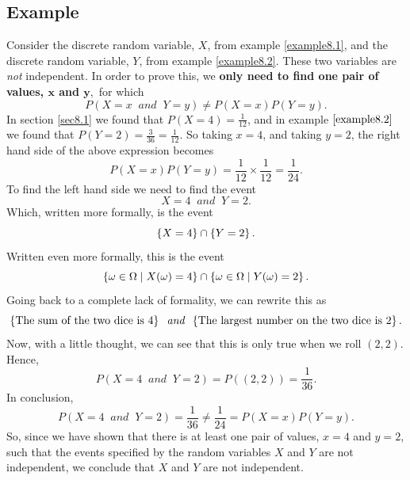 \subsection{Example}
Consider the discrete random variable, $X$, from example \ref{example8.1}, and the discrete random variable, $Y$, from example \ref{example8.2}. These two variables are \textit{not} independent. In order to prove this, we \textbf{only need to find one pair of values, $\boldsymbol{x}$ and $\boldsymbol{y},$} for which
\[
P(X = x \;\; \textit{and} \;\; Y = y) \neq P(X = x)P(Y = y).
\] 
In section \ref{sec8.1} we found that $P(X = 4) = \frac{1}{12}$, and in example $\ref{example8.2}$ we found that $P(Y = 2) = \frac{3}{36} = \frac{1}{12}$. So taking $x = 4$, and taking $y = 2$, the right hand side of the above expression becomes
\[
 P(X = x)P(Y = y) = \frac{1}{12}\times\frac{1}{12} = \frac{1}{24}.
\]
To find the left hand side we need to find the event
\[
X = 4 \;\; \textit{and} \;\; Y = 2.
\]
Which, written more formally, is the event
\[
\left\{X = 4\right\} \cap \left\{Y = 2\right\}.
\]
Written even more formally, this is the event
\[
\left\{\omega \in \Omega \mid X(\omega) = 4\right\} \cap \left\{\omega \in \Omega \mid Y(\omega) = 2\right\}.
\]
Going back to a complete lack of formality, we can rewrite this as
\[
\left\{\text{The sum of the two dice is 4}\right\} \;\; \textit{and} \;\; \left\{\text{The largest number on the two dice is 2}\right\}.
\]
Now, with a little thought, we can see that this is only true when we roll $(2,2).$ Hence,
\[
P(X = 4 \;\; \textit{and} \;\; Y = 2) = P((2,2)) = \frac{1}{36}.
\]
In conclusion,
\[
P(X = 4 \;\; \textit{and} \;\; Y = 2) = \frac{1}{36} \neq \frac{1}{24} =  P(X = x)P(Y = y).
\]
So, since we have shown that there is at least one pair of values, $x = 4$ and $y = 2$, such that the events specified by the random variables $X$ and $Y$ are not independent, we conclude that $X$ and $Y$ are not independent.


